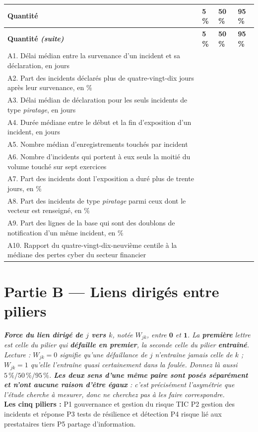 \documentclass[11pt,a4paper]{article}
\begin{document}
\vspace{0.2cm}
\begin{longtable}{|p{9.6cm}|A|A|A|}
\hline
{}
\textbf{Quantité} & \textbf{5\,\%} & \textbf{50\,\%} & \textbf{95\,\%} \\ \hline
\endfirsthead
\hline
{}
\textbf{Quantité \emph{(suite)}} & \textbf{5\,\%} & \textbf{50\,\%} & \textbf{95\,\%} \\ \hline
\endhead
A1. Délai médian entre la survenance d'un incident et sa déclaration, en jours & & & \\ \hline
A2. Part des incidents déclarés plus de quatre-vingt-dix jours après leur survenance, en \% & & & \\ \hline
A3. Délai médian de déclaration pour les seuls incidents de type \emph{piratage}, en jours & & & \\ \hline
A4. Durée médiane entre le début et la fin d'exposition d'un incident, en jours & & & \\ \hline
A5. Nombre médian d'enregistrements touchés par incident & & & \\ \hline
A6. Nombre d'incidents qui portent à eux seuls la moitié du volume touché sur sept exercices & & & \\ \hline
A7. Part des incidents dont l'exposition a duré plus de trente jours, en \% & & & \\ \hline
A8. Part des incidents de type \emph{piratage} parmi ceux dont le vecteur est renseigné, en \% & & & \\ \hline
A9. Part des lignes de la base qui sont des doublons de notification d'un même incident, en \% & & & \\ \hline
A10. Rapport du quatre-vingt-dix-neuvième centile à la médiane des pertes cyber du secteur financier & & & \\ \hline
\end{longtable}

\section*{Partie B --- Liens dirigés entre piliers}
\footnotesize\emph{\textbf{Force du lien dirigé de $j$ vers $k$}, notée $W_{jk}$, entre
$\mathbf{0}$ et $\mathbf{1}$. La \textbf{première} lettre est celle du pilier qui
\textbf{défaille en premier}, la seconde celle du pilier \textbf{entraîné}. Lecture :
$W_{jk}=0$ signifie qu'une défaillance de $j$ n'entraîne \emph{jamais} celle de $k$ ;
$W_{jk}=1$ qu'elle l'entraîne \emph{quasi certainement} dans la foulée. Donnez là aussi
$5\,\% / 50\,\% / 95\,\%$. \textbf{Les deux sens d'une même paire sont posés séparément et
n'ont aucune raison d'être égaux} : c'est précisément l'asymétrie que l'étude cherche à
mesurer, donc ne cherchez pas à les faire correspondre.}\\[3pt]
\textbf{Les cinq piliers :} P1 gouvernance et gestion du risque TIC \textbullet{} P2 gestion
des incidents et réponse \textbullet{} P3 tests de résilience et détection \textbullet{}
P4 risque lié aux prestataires tiers \textbullet{} P5 partage d'information.
\normalsize
\end{document}
